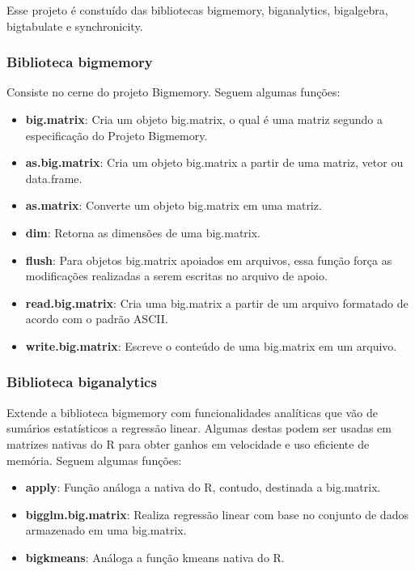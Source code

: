 \documentclass[12pt]{article}
\begin{document}
Esse projeto é constuído das bibliotecas bigmemory, biganalytics, bigalgebra, bigtabulate e synchronicity.

\subsubsection{Biblioteca bigmemory}

Consiste no cerne do projeto Bigmemory. Seguem algumas funções:

\begin{itemize}
\item \textbf{big.matrix}: Cria um objeto big.matrix, o qual é uma matriz segundo a especificação do Projeto Bigmemory.
\item \textbf{as.big.matrix}: Cria um objeto big.matrix a partir de uma matriz, vetor ou data.frame.
\item \textbf{as.matrix}: Converte um objeto big.matrix em uma matriz.
\item \textbf{dim}: Retorna as dimensões de uma big.matrix.
\item \textbf{flush}: Para objetos big.matrix apoiados em arquivos, essa função força as modificações realizadas a serem escritas no arquivo de apoio.
\item \textbf{read.big.matrix}: Cria uma big.matrix a partir de um arquivo formatado de acordo com o padrão ASCII. 
\item \textbf{write.big.matrix}: Escreve o conteúdo de uma big.matrix em um arquivo.
\end{itemize}

\subsubsection{Biblioteca biganalytics}

Extende a biblioteca bigmemory com funcionalidades analíticas que vão de sumários estatísticos a regressão linear. Algumas destas podem ser usadas em matrizes nativas do R para obter ganhos em velocidade e uso eficiente de memória. Seguem algumas funções:

\begin{itemize}
\item \textbf{apply}: Função análoga a nativa do R, contudo, destinada a big.matrix.
\item \textbf{bigglm.big.matrix}: Realiza regressão linear com base no conjunto de dados armazenado em uma big.matrix.
\item \textbf{bigkmeans}: Análoga a função kmeans nativa do R.
\end{itemize}
\end{document}
